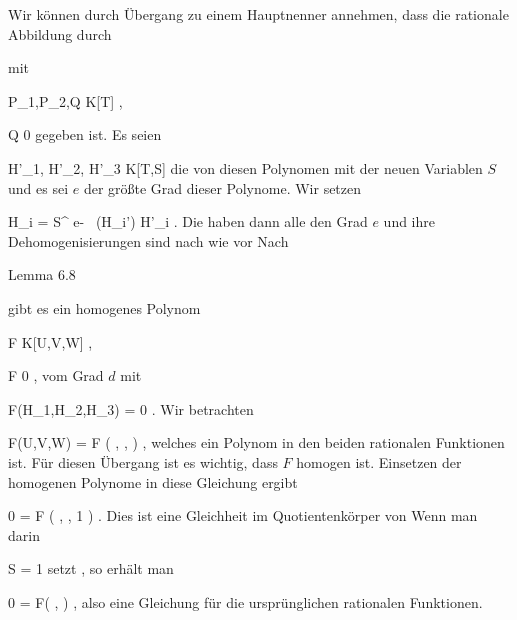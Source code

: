 {





Wir können durch Übergang zu einem Hauptnenner annehmen, dass die rationale Abbildung durch

 {  }

mit

\mavergleichskette
{\vergleichskette
{ P_1,P_2,Q
}
{ \in }{ K[T]
}
{  }{
}
{    }{
}
{   }{
}
}
{}{}{,}

\mavergleichskette
{\vergleichskette
{ Q
}
{ \neq }{ 0
}
{  }{
}
{    }{
}
{   }{
}
}
{}{}{}
gegeben ist. Es seien

\mavergleichskette
{\vergleichskette
{ H'_1, H'_2, H'_3
}
{ \in }{ K[T,S]
}
{  }{
}
{    }{
}
{   }{
}
}
{}{}{}
die
von diesen Polynomen mit der neuen Variablen $S$ und es sei $e$ der größte Grad dieser Polynome. Wir setzen

\mavergleichskette
{\vergleichskette
{ H_i
}
{ = }{ S^{ e-  \, (H_i') }  H'_i
}
{  }{
}
{    }{
}
{   }{
}
}
{}{}{.}
Die
 haben dann alle den Grad $e$ und ihre Dehomogenisierungen
 {} {}
sind nach wie vor
 Nach

Lemma 6.8

gibt es ein homogenes Polynom

\mavergleichskette
{\vergleichskette
{ F
}
{ \in }{ K[U,V,W]
}
{  }{
}
{    }{
}
{   }{
}
}
{}{}{,}

\mavergleichskette
{\vergleichskette
{ F
}
{ \neq }{ 0
}
{  }{
}
{    }{
}
{   }{
}
}
{}{}{,}
vom Grad $d$
 {} {}
mit

\mavergleichskettedisp
{\vergleichskette
{ F(H_1,H_2,H_3)
}
{ =} { 0
}
{ } {
}
{ } {
}
{ } {
}
}
{}{}{.}
Wir betrachten

\mavergleichskettedisp
{\vergleichskette
{  F(U,V,W)
}
{ =} { F \left( , ,  \right)
}
{ } {
}
{ } {
}
{ } {
}
}
{}{}{,}
welches ein Polynom in den beiden rationalen Funktionen
 ist. Für diesen Übergang ist es wichtig, dass $F$ homogen ist. Einsetzen der homogenen Polynome in diese Gleichung ergibt

\mavergleichskettedisp
{\vergleichskette
{ 0
}
{ =} { F \left( , , 1 \right)
}
{ } {
}
{ } {
}
{ } {
}
}
{}{}{.}
Dies ist eine Gleichheit im Quotientenkörper von
 Wenn man darin

\mavergleichskette
{\vergleichskette
{ S
}
{ = }{ 1
}
{  }{
}
{    }{
}
{   }{
}
}
{}{}{}
setzt
 {} {,}
so erhält man

\mavergleichskettedisp
{\vergleichskette
{ 0
}
{ =} { F\left( ,  \right)
}
{ } {
}
{ } {
}
{ } {
}
}
{}{}{,}
also eine Gleichung für die ursprünglichen rationalen Funktionen.




}




